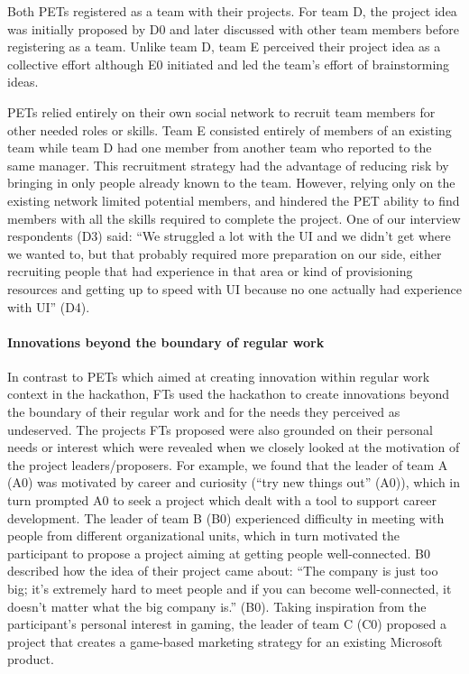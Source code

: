 \documentclass{hcij}
\begin{document}
Both PETs registered as a team with their projects. For team D, the project idea was initially proposed by D0 and later discussed with other team members before registering as a team. Unlike team D, team E perceived their project idea as a collective effort although E0 initiated and led the team’s effort of brainstorming ideas.

PETs relied entirely on their own social network to recruit team members for other needed roles or skills. Team E consisted entirely of members of an existing team while team D had one member from another team who reported to the same manager. This recruitment strategy had the advantage of reducing risk by bringing in only people already known to the team. However, relying only on the existing network limited potential members, and hindered the PET ability to find members with all the skills required to complete the project. One of our interview respondents (D3) said: “We struggled a lot with the UI and we didn't get where we wanted to, but that probably required more preparation on our side, either recruiting people that had experience in that area or kind of provisioning resources and getting up to speed with UI because no one actually had experience with UI” (D4).

\paragraph{Innovations beyond the boundary of regular work}
In contrast to PETs which aimed at creating innovation within regular work context in the hackathon, FTs used the hackathon to create innovations beyond the boundary of their regular work and for the needs they perceived as undeserved. The projects FTs proposed were also grounded on their personal needs or interest which were revealed when we closely looked at the motivation of the project leaders/proposers. For example, we found that the leader of team A (A0) was motivated by career and curiosity (“try new things out” (A0)), which in turn prompted A0 to seek a project which dealt with a tool to support career development. The leader of team B (B0) experienced difficulty in meeting with people from different organizational units, which in turn motivated the participant to propose a project aiming at getting people well-connected. B0 described how the idea of their project came about: “The company is just too big; it’s extremely hard to meet people and if you can become well-connected, it doesn’t matter what the big company is.” (B0). Taking inspiration from the participant’s personal interest in gaming, the leader of team C (C0) proposed a project that creates a game-based marketing strategy for an existing Microsoft product.
\end{document}

